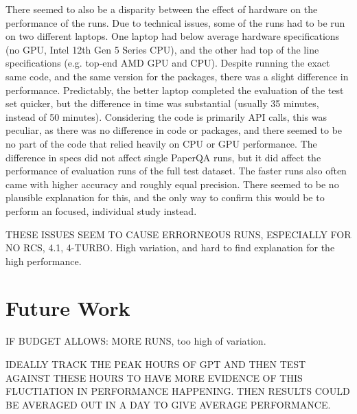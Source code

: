 There seemed to also be a disparity between the effect of hardware on the performance of the runs. Due to technical issues, some of the runs had to be run on two different laptops. One laptop had below average hardware specifications (no GPU, Intel 12th Gen 5 Series CPU), and the other had top of the line specifications (e.g. top-end AMD GPU and CPU). Despite running the exact same code, and the same version for the packages, there was a slight difference in performance. Predictably, the better laptop completed the evaluation of the test set quicker, but the difference in time was substantial (usually 35 minutes, instead of 50 minutes). Considering the code is primarily API calls, this was peculiar, as there was no difference in code or packages, and there seemed to be no part of the code that relied heavily on CPU or GPU performance. 
The difference in specs did not affect single PaperQA runs, but it did affect the performance of evaluation runs of the full test dataset. The faster runs also often came with higher accuracy and roughly equal precision. There seemed to be no plausible explanation for this, and the only way to confirm this would be to perform an focused, individual study instead. 

THESE ISSUES SEEM TO CAUSE ERRORNEOUS RUNS, ESPECIALLY FOR NO RCS, 4.1, 4-TURBO. High variation, and hard to find explanation for the high performance. 

\section{Future Work}

IF BUDGET ALLOWS: MORE RUNS, too high of variation. 

IDEALLY TRACK THE PEAK HOURS OF GPT AND THEN TEST AGAINST THESE HOURS TO HAVE MORE EVIDENCE OF THIS FLUCTIATION IN PERFORMANCE HAPPENING. THEN RESULTS COULD BE AVERAGED OUT IN A DAY TO GIVE AVERAGE PERFORMANCE. 


